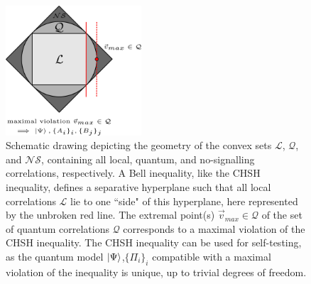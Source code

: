 \begin{figure}
    \centering
    \includegraphics[width=0.45\textwidth]{images/self-testingcorr.png}
    \caption{Schematic drawing depicting the geometry of the convex sets $\mathcal{L}$, $\mathcal{Q}$, and $\mathcal{NS}$, containing all local, quantum, and no-signalling correlations, respectively. A Bell inequality, like the CHSH inequality, defines a separative hyperplane such that all local correlations $\mathcal{L}$ lie to one ``side" of this hyperplane, here represented by the unbroken red line. The extremal point(s) $\Vec{v}_{max}\in\mathcal{Q}$ of the set of quantum correlations $\mathcal{Q}$ corresponds to a maximal violation of the CHSH inequality. The CHSH inequality can be used for self-testing, as the quantum model $\ket{\Psi}$,$\{\Pi_i\}_i$ compatible with a maximal violation of the inequality is unique, up to trivial degrees of freedom.}
    \label{fig:selftestingcorr}
\end{figure}


